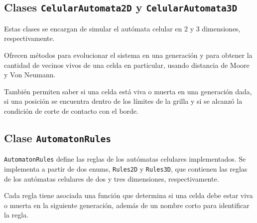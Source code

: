 \subsection{Clases \texttt{CelularAutomata2D} y \texttt{CelularAutomata3D}}
\label{subsec:celularautomata}
Estas clases se encargan de simular el autómata celular en 2 y 3 dimensiones, respectivamente.

Ofrecen métodos para evolucionar el sistema en una generación y para obtener la cantidad de vecinos vivos de una celda en particular, usando distancia de Moore y Von Neumann.

También permiten saber si una celda está viva o muerta en una generación dada, si una posición se encuentra dentro de los límites de la grilla y si se alcanzó la condición de corte de contacto con el borde.

\subsection{Clase \texttt{AutomatonRules}}
\label{subsec:automatonrules}
\texttt{AutomatonRules} define las reglas de los autómatas celulares implementados.
Se implementa a partir de dos enums, \texttt{Rules2D} y \texttt{Rules3D}, que contienen las reglas de los autómatas celulares de dos y tres dimensiones, respectivamente.

Cada regla tiene asociada una función que determina si una celda debe estar viva o muerta en la siguiente generación, además de un nombre corto para identificar la regla.